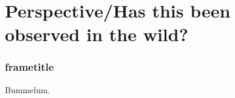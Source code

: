 \section{Perspective/Has this been observed in the wild?}

\begin{frame}
  \frametitle{frametitle}
%
Bummelum.
%
\end{frame}
